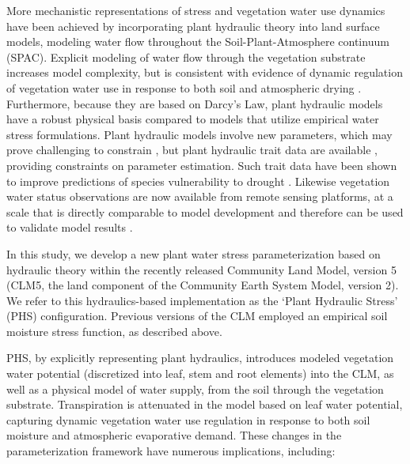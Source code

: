 \documentclass[draft,linenumbers]{agujournal}
\begin{document}
More mechanistic representations of stress and vegetation water use dynamics have been achieved by incorporating plant hydraulic theory into land surface models, modeling water flow throughout the Soil-Plant-Atmosphere continuum (SPAC)\citep{xu2016,christoffersen2016,sperry2017}.
Explicit modeling of water flow through the vegetation substrate increases model complexity, but is consistent with evidence of dynamic regulation of vegetation water use in response to both soil and atmospheric drying \citep{tardieu1998,sperry1998,sperry2015}.
Furthermore, because they are based on Darcy's Law, plant hydraulic models have a robust physical basis compared to models that utilize empirical water stress formulations.
Plant hydraulic models involve new parameters, which may prove challenging to constrain \citep{drake2017}, but plant hydraulic trait data are available \citep{kattge2011,anderegg2015a}, providing constraints on parameter estimation.   
Such trait data have been shown to improve predictions of species vulnerability to drought \citep{choat2012,mackay2015,powell2018,giardina2018,anderegg2018} .
Likewise vegetation water status observations are now available from remote sensing platforms, at a scale that is directly comparable to model development \citep{konings2016,grant2016} and therefore can be used to validate model results \citep{momen2017,konings2017b}.

In this study, we develop a new plant water stress parameterization based on hydraulic theory within the recently released Community Land Model, version 5 (CLM5, the land component of the Community Earth System Model, version 2). 
We refer to this hydraulics-based implementation as the `Plant Hydraulic Stress' (PHS) configuration. 
Previous versions of the CLM employed an empirical soil moisture stress function, as described above.

PHS, by explicitly representing plant hydraulics, introduces modeled vegetation water potential (discretized into leaf, stem and root elements) into the CLM, as well as a physical model of water supply, from the soil through the vegetation substrate. 
Transpiration is attenuated in the model based on leaf water potential, capturing dynamic vegetation water use regulation in response to both soil moisture and atmospheric evaporative demand. 
These changes in the parameterization framework have numerous implications, including: 
\end{document}
